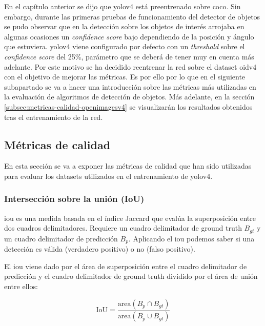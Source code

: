 En el capítulo anterior se dijo que \gls{yolov4} está preentrenado sobre \gls{coco}. Sin embargo, durante las primeras pruebas de funcionamiento del detector de objetos se pudo observar que en la detección sobre los objetos de interés arrojaba en algunas ocasiones un \textit{confidence score} bajo dependiendo de la posición y ángulo que estuviera. \gls{yolov4} viene configurado por defecto con un \textit{threshold} sobre el \textit{confidence score} del 25\%, parámetro que se deberá de tener muy en cuenta más adelante. Por este motivo se ha decidido reentrenar la red sobre el dataset \gls{oidv4} con el objetivo de mejorar las métricas. Es por ello por lo que en el siguiente subapartado se va a hacer una introducción sobre las métricas más utilizadas en la evaluación de algoritmos de detección de objetos. Más adelante, en la sección \ref{subsec:metricas-calidad-openimagesv4} se visualizarán los resultados obtenidos tras el entrenamiento de la red.

\subsection{Métricas de calidad}
\label{subsec:metricas-calidad}

En esta sección se va a exponer las métricas de calidad \cite{padillaCITE2020} que han sido utilizadas para evaluar los datasets utilizados en el entrenamiento de \gls{yolov4}.

\subsubsection{Intersección sobre la unión (IoU)}
\label{subsubsec:iou}

\gls{iou} es una medida basada en el índice Jaccard que evalúa la superposición entre dos cuadros delimitadores. Requiere un cuadro delimitador de ground truth $B_{gt}$ y un cuadro delimitador de predicción $B_{p}$. Aplicando el \gls{iou} podemos saber si una detección es válida (verdadero positivo) o no (falso positivo).

El \gls{iou} viene dado por el área de superposición entre el cuadro delimitador de predicción y el cuadro delimitador de ground truth dividido por el área de unión entre ellos:

\begin{equation}
\label{eq:iou}
\text{IoU}=\frac{\text{area}\left(B_{p} \cap B_{gt} \right)}{\text{area}\left(B_{p} \cup B_{gt} \right)}    
\end{equation}

